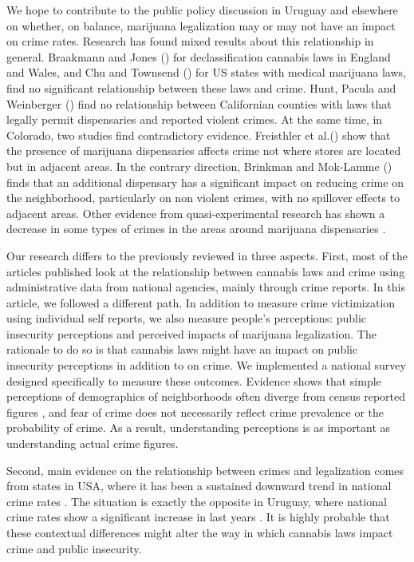 \documentclass[11pt]{article}
\begin{document}
We hope to contribute to the public policy discussion in Uruguay and elsewhere on whether, on balance, marijuana legalization may or may not have an impact on crime rates. Research has found mixed results about this relationship in general. Braakmann and Jones (\citeyear{braakmann2014cannabis}) for declassification cannabis laws in England and Wales, and Chu and Townsend (\citeyear{chu2019joint}) for US states with medical marijuana laws, find no significant relationship between these laws and crime. Hunt, Pacula and Weinberger (\citeyear{hunt2018high}) find no relationship between Californian counties with laws that legally permit dispensaries and reported violent crimes. At the same time, in Colorado, two studies find contradictory evidence. Freisthler et al.(\citeyear{freisthler2016micro}) show that the presence of marijuana dispensaries affects crime not where stores are located but in adjacent areas. In the contrary direction, Brinkman and Mok-Lamme (\citeyear{brinkman2019not}) finds that an additional dispensary has a significant impact on reducing crime on the neighborhood, particularly on non violent crimes, with no spillover effects to adjacent areas.  Other evidence from  quasi-experimental research has shown a decrease in some types of crimes in the areas around marijuana dispensaries \citep{dragone2019crime, gavrilova2014legal, Indigo:2016}.

Our research differs to the previously reviewed in three aspects. First, most of the articles published look at the relationship between cannabis laws and crime using administrative data from national agencies, mainly through crime reports. In this article, we followed a different path. In addition to measure crime victimization using individual self reports, we also measure people's perceptions: public insecurity perceptions and perceived impacts of marijuana legalization. The rationale to do so is that cannabis laws might have an impact on public insecurity perceptions in addition to on crime. We implemented a national survey designed specifically to measure these outcomes. Evidence shows that simple perceptions of demographics of neighborhoods often diverge from census reported figures \citep{wong2012bringing}, and fear of crime does not necessarily reflect crime prevalence or the probability of crime. As a result, understanding perceptions is as important as understanding actual crime figures. 

Second, main evidence on the relationship between crimes and legalization comes from states in USA, where it has been a sustained downward trend in national crime rates \citep{gramlich5facts, james2018recent}. The situation is exactly the opposite in Uruguay, where national crime rates show a significant increase in last years \citep{del2018obstacles, paternain2008panorama, aboal2007crimen}. It is highly probable that these contextual differences might alter the way in which cannabis laws impact crime and public insecurity.
\end{document}
